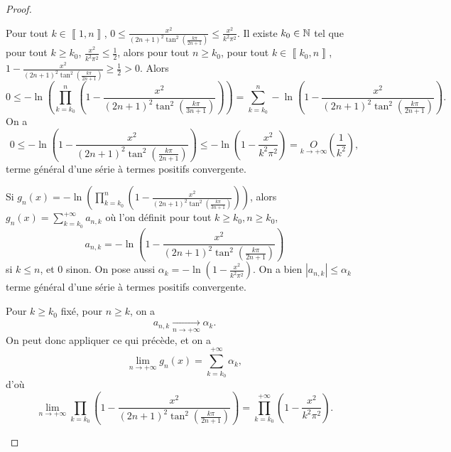 \documentclass[12pt]{article}
\begin{document}
\begin{proof}
\begin{enumerate}
    Pour tout $k\in\left\llbracket1,n\right\rrbracket$, $0\leqslant\frac{x^{2}}{(2n+1)^{2}\tan^{2}\left(\frac{k\pi}{2n+1}\right)}\leqslant\frac{x^{2}}{k^{2}\pi^{2}}$. Il existe $k_{0}\in\mathbb{N}$ tel que pour tout $k\geqslant k_{0}$, $\frac{x^{2}}{k^{2}\pi^{2}}\leqslant\frac{1}{2}$, alors pour tout $n\geqslant k_{0}$, pour tout $k\in\left\llbracket k_{0},n\right\rrbracket$, $1-\frac{x^{2}}{(2n+1)^{2}\tan^{2}\left(\frac{k\pi}{2n+1}\right)}\geqslant\frac{1}{2}>0$. Alors 
    \begin{equation}
        0\leqslant -\ln\left(\prod_{k=k_{0}}^{n}\left(1-\frac{x^{2}}{\left(2n+1\right)^{2}\tan^{2}\left(\frac{k\pi}{3n+1}\right)}\right)\right)=\sum_{k=k_{0}}^{n}-\ln\left(1-\frac{x^{2}}{(2n+1)^{2}\tan^{2}\left(\frac{k\pi}{2n+1}\right)}\right).
    \end{equation}
    On a 
    \begin{equation}
        0\leqslant-\ln\left(1-\frac{x^{2}}{(2n+1)^{2}\tan^{2}\left(\frac{k\pi}{2n+1}\right)}\right)\leqslant-\ln\left(1-\frac{x^{2}}{k^{2}\pi^{2}}\right)=\underset{k\to+\infty}{O}\left(\frac{1}{k^{2}}\right),
    \end{equation}
    terme général d'une série à termes positifs convergente.

    Si $g_{n}(x)=-\ln\left(\prod_{k=k_{0}}^{n}\left(1-\frac{x^{2}}{\left(2n+1\right)^{2}\tan^{2}\left(\frac{k\pi}{3n+1}\right)}\right)\right)$, alors $g_{n}(x)=\sum_{k=k_{0}}^{+\infty}a_{n,k}$ où l'on définit pour tout $k\geqslant k_{0},n\geqslant k_{0}$,
    \begin{equation}
        a_{n,k}=-\ln\left(1-\frac{x^{2}}{(2n+1)^{2}\tan^{2}\left(\frac{k\pi}{2n+1}\right)}\right)
    \end{equation}
    si $k\leqslant n$, et 0 sinon. On pose aussi $\alpha_{k}=-\ln\left(1-\frac{x^{2}}{k^{2}\pi^{2}}\right)$. On a bien $\left\lvert a_{n,k}\right\rvert\leqslant\alpha_{k}$ terme général d'une série à termes positifs convergente.

    Pour $k\geqslant k_{0}$ fixé, pour $n\geqslant k$, on a 
    \begin{equation}
        a_{n,k}\xrightarrow[n\to+\infty]{}\alpha_{k}.
    \end{equation}
    On peut donc appliquer ce qui précède, et on a 
    \begin{equation}
        \lim\limits_{n\to+\infty}g_{n}(x)=\sum_{k=k_{0}}^{+\infty}\alpha_{k},
    \end{equation}
    d'où
    \begin{equation}
        \lim\limits_{n\to+\infty}\prod_{k=k_{0}}\left(1-\frac{x^{2}}{(2n+1)^{2}\tan^{2}\left(\frac{k\pi}{2n+1}\right)}\right)=\prod_{k=k_{0}}^{+\infty}\left(1-\frac{x^{2}}{k^{2}\pi^{2}}\right).
    \end{equation}


\end{enumerate}
\end{proof}
\end{document}

